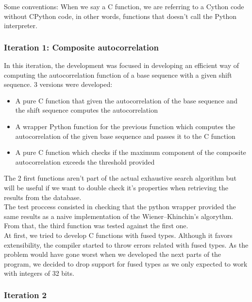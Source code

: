       Some conventions: When we say a C function, we are referring to a Cython
      code without CPython code, in other words, functions that doesn't call
      the Python interpreter.

      \subsubsection{Iteration 1: Composite autocorrelation}

      In this iteration, the development was focused in developing an efficient
      way of computing the autocorrelation function of a base sequence with a
      given shift sequence. 3 versions were developed:
      \begin{itemize}
        \item A pure C function that given the autocorrelation of the base
        sequence and the shift sequence computes the autocorrelation
        \item A wrapper Python function for the previous function which
        computes the autocorrelation of the given base sequence and passes it
        to the C function
        \item A pure C function which checks if the maximum component of the
        composite autocorrelation exceeds the threshold provided
      \end{itemize}

      The 2 first functions aren't part of the actual exhaustive search
      algorithm but will be useful if we want to double check it's properties
      when retrieving the results from the database. \\

      The test proccess consisted in checking that the python wrapper provided
      the same results as a naive implementation of the Wiener–Khinchin's
      algorythm. From that, the third function was tested against the first
      one.\\

      At first, we tried to develop C functions with fused types. Although it
      favors extensibility, the compiler started to throw errors related with
      fused types. As the problem would have gone worst when we developed the
      next parts of the program, we decided to drop support for fused types as
      we only expected to work with integers of 32 bits.\\

      \subsubsection{Iteration 2}

